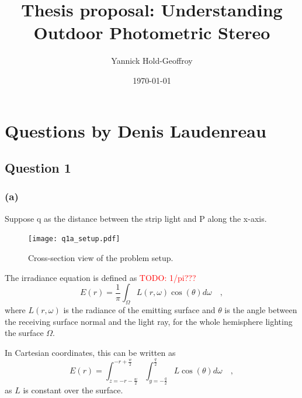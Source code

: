 \documentclass{report}
\title{Thesis proposal: Understanding Outdoor Photometric Stereo}
\author{Yannick Hold-Geoffroy}
\date{\today}
\begin{document}

\maketitle

\tableofcontents

\hypersetup{colorlinks=true,linkcolor=blue}

\newcommand*\B[1]{\mathbf{#1}}
\newcommand{\boldomega}{\boldsymbol \omega} %
\newcommand{\boldmu}{\boldsymbol \mu} %
\newcommand{\bolddelta}{\boldsymbol \delta} %

\newcommand\norm[1]{\left\lVert#1\right\rVert}

\newcommand\todo[1]{\textcolor{red}{TODO: #1}}

\graphicspath{{figures/}}

\chapter{Questions by Denis Laudenreau}

\section{Question 1}

\subsection{(a)}

Suppose q as the distance between the strip light and P along the x-axis.

\begin{figure}
  \centering
  \texttt{[image: q1a\_setup.pdf]}
  \caption[Problem setup]
   {Cross-section view of the problem setup.}
  \label{q1a:setup}
\end{figure}

The irradiance equation is defined as \todo{1/pi???}
\begin{equation}
E(r) = \frac{1}{\pi} \int_{\Omega} L(r,\omega)\cos(\theta) d\omega
\quad,
\end{equation}
where $L(r,\omega)$ is the radiance of the emitting surface and $\theta$ is the angle between the receiving surface normal and the light ray, for the whole hemisphere lighting the surface $\Omega$.

In Cartesian coordinates, this can be written as
\begin{equation}
E(r) = \int_{z= -r - \frac{w}{2}}^{-r+\frac{w}{2}} \int_{y= - \frac{q}{2}}^{\frac{q}{2}} L \cos(\theta) d\omega
\quad,
\label{q1a:irr}
\end{equation}
as $L$ is constant over the surface.
\end{document}
